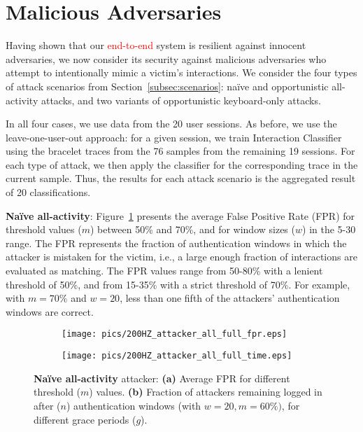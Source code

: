\documentclass[conference]{IEEEtran}
\newcommand{\KBactivity}{keyboard-only\xspace}
\newcommand{\allactivity}{all-activity\xspace}
\newif\ifllncs
\newcommand\changeMika[1]{\textcolor{red}{#1}}
\newcommand\changeMika[1]{{#1}}
\begin{document}
\section{Malicious Adversaries}
\label{sec:results}

Having shown that our \changeMika{end-to-end} system is resilient against innocent adversaries, we now consider its security against malicious adversaries who attempt to intentionally mimic a victim's interactions. We consider the four types of attack scenarios from Section~\ref{subsec:scenarios}: na\"ive and opportunistic \allactivity attacks, and two variants of opportunistic \KBactivity attacks.

In all four cases, we use data from the 20 user sessions. As before, we use the leave-one-user-out approach: for a given session, we train Interaction Classifier using the bracelet traces from the 76 samples from the remaining 19 sessions. For each type of attack, we then apply the classifier for the corresponding trace in the current sample. Thus, the results for each attack scenario is the aggregated result of 20 classifications.

\vspace{1mm}
\noindent
\textbf{Na\"ive \allactivity}:
Figure~\ref{fig:all_full_fpr} presents the average False Positive Rate (FPR) for threshold values ($m$) between 50\% and 70\%, and for window sizes ($w$) in the 5-30 range. The FPR represents the fraction of authentication windows in which the attacker is mistaken for the victim, i.e., a large enough fraction of interactions are evaluated as matching. The FPR values range from 50-80\% with a lenient threshold of 50\%, and from 15-35\% with a strict threshold of 70\%. For example, with $m=70\%$ and $w=20$, less than one fifth of the attackers' authentication windows are correct.

\ifllncs

\captionsetup[table]{font=small,skip=0pt}

\begin{figure}
	\vspace{-5mm}
\centering
\begin{subfigure}{.5\textwidth}
  \centering
  \texttt{[image: pics/200HZ\_attacker\_all\_full\_fpr.eps]}
\caption{}
  \label{fig:all_full_fpr}
\end{subfigure}\begin{subfigure}{.5\textwidth}
  \centering
  \texttt{[image: pics/200HZ\_attacker\_all\_full\_time.eps]}
\caption{}
  \label{fig:all_full_time}
\end{subfigure}
\caption{\textbf{Na\"ive \allactivity} attacker: \textbf{(a)} Average
  FPR for different threshold ($m$) values. \textbf{(b)} Fraction of
  attackers remaining logged in after ($n$) authentication windows (with $w=20, m=60\%)$, for different grace periods ($g$).}
	\vspace{-5mm}
\end{figure}
\end{document}
